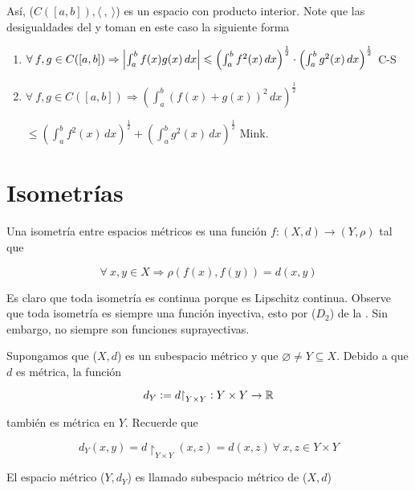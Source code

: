 \begin{remark}

    Así, ($C([a,b]), \langle \: , \: \rangle$) es un espacio con producto interior. Note que las desigualdades del  y  toman en este caso la siguiente forma

    \begin{enumerate}
        \item $\forall \: f , g \in C([a,b]) \Rightarrow \abs{\int_{a}^{b} f(x)g(x) \, dx} \leqslant {\left( \int_{a}^{b} f^2(x) \, dx \right)}^{\frac{1}{2}} \cdot {\left( \int_{a}^{b} g^2(x) \, dx \right)}^{\frac{1}{2}}$ \hfill \textcolor{Purple!70!black}{C-S}
        \item $\forall \: f , g \in C([a,b]) \Rightarrow {\left( \int_{a}^{b} {(f(x)+g(x))}^{2} \, dx \right)}^{\frac{1}{2}}$

        $ \leqslant {\left( \int_{a}^{b} f^2(x) \, dx \right)}^{\frac{1}{2}} + {\left( \int_{a}^{b} g^2(x) \, dx \right)}^{\frac{1}{2}}$ \hfill \textcolor{Purple!70!black}{Mink.}

    \end{enumerate}
    
\end{remark}

\section{Isometrías}

\begin{definition}[Isometría]
    Una isometría entre espacios métricos es una función $f: (X,d) \to (Y,\rho)$ tal que

    \begin{equation*}
        \forall \: x,y \in X \Rightarrow \rho(f(x),f(y)) = d(x,y)
    \end{equation*}

    Es claro que toda isometría es continua porque es Lipschitz continua. Observe que toda isometría es siempre una función inyectiva, esto por ($D_2$) de la . Sin embargo, no siempre son funciones suprayectivas. 
\end{definition}

\begin{definition}
    Supongamos que ($X,d$) es un subespacio métrico y que $\varnothing \neq Y \subseteq X$. Debido a que $d$ es métrica, la función

    \begin{equation*}
        d_Y := d{\restriction}_{Y \times Y} : Y \times Y \to \mathbb{R}
    \end{equation*}

    también es métrica en $Y$. Recuerde que

    \begin{equation*}
    {d}_{Y}(x,y) =  d{\restriction}_{Y \times Y} (x,z) = d(x,z) \: \forall \: x,z \in Y \times Y
    \end{equation*}

    El espacio métrico ($Y,{d}_{Y} $) es llamado subespacio métrico de ($X,d$)
\end{definition}

